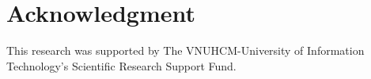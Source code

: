 \documentclass[conference]{IEEEtran}
\begin{document}
\section*{Acknowledgment}
This research was supported by The VNUHCM-University of Information Technology's Scientific Research Support Fund.
\nocite{huynh-etal-2022-vinli}
\renewcommand{\refname}{References}


\end{document}
